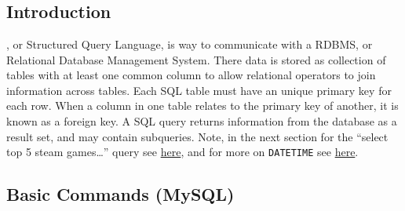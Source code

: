 \chapter{\sql}
\label{sql}

\section{Introduction}
\label{sql:intro}

\sql, or Structured Query Language, is way to
communicate with a RDBMS, or Relational Database Management System.
There data is stored as collection of tables with
at least one common column to allow relational operators
to join information across tables.
Each SQL table must have an unique primary key for each row.
When a column in one table relates to the primary key of another, it is known as a foreign key.
A SQL query returns information from the database as a result set, and may contain subqueries.
Note, in the next section for the ``select top 5 steam games\ldots'' query
see \href{https://www.databasejournal.com/features/mysql/selecting-the-top-n-results-by-group-in-mysql.html}{here},
and for more on \texttt{DATETIME}
see \href{https://www.techotopia.com/index.php/Working_with_Dates_and_Times_in_MySQL}{here}.

\section{Basic Commands (MySQL)}
\label{sql:basic}


